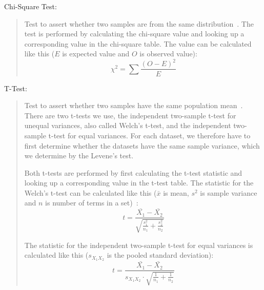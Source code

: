 \begin{framed}
  \hypertarget{metric:chi}{Chi-Square Test:}
  \begin{quote}
    Test to assert whether two samples are from the same distribution~\cite[Chapter~14]{press1996numerical}. The test is performed by calculating the chi-square value and looking up a corresponding value in the chi-square table. The value can be calculated like this ($E$ is expected value and $O$ is observed value):
    $$\chi^2 = \sum\frac{(O - E)^2}{E}$$
  \end{quote}

  \hypertarget{metric:tt}{T-Test:}
  \begin{quote}
    Test to assert whether two samples have the same population mean~\cite{Ruxton01072006}. There are two t-tests we use, the independent two-sample t-test for unequal variances, also called Welch's t-test, and the independent two-sample t-test for equal variances. For each dataset, we therefore have to first determine whether the datasets have the same sample variance, which we determine by the Levene's test.

    Both t-tests are performed by first calculating the t-test statistic and looking up a corresponding value in the t-test table. The statistic for the Welch's t-test can be calculated like this ($\bar{x}$ is mean, $s^2$ is sample variance and $n$ is number of terms in a set)~\cite{Ruxton01072006}:
    $$t = \frac{\bar{X_1} - \bar{X_2}}{\sqrt{\frac{s_1^2}{n_1} + \frac{s_2^2}{n_2}}}$$

    The statistic for the independent two-sample t-test for equal variances is calculated like this ($s_{X_1 X_2}$ is the pooled standard deviation):
    $$t = \frac{\bar{X_1} - \bar{X_2}}{s_{X_1 X_2} \cdot \sqrt{\frac{1}{n_1} + \frac{1}{n_2}}}$$
  \end{quote}
\end{framed}

